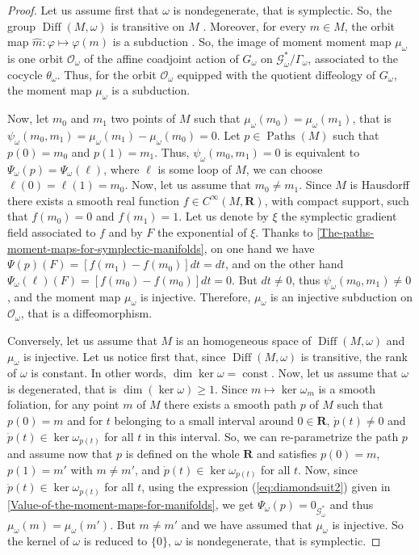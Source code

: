 \documentclass[10pt,reqno,twoside]{amsart}
\newcommand{\RR}{\mathbf{R}}
\newcommand{\cG}{\mathcal{G}}
\newcommand{\cO}{\mathcal{O}}
\DeclareMathOperator{\Diff}{Diff}
\DeclareMathOperator{\Paths}{Paths}
\DeclareMathOperator{\const}{const}
\newcommand{\Cinfty}{C^\infty}
\theoremstyle{plain}
\theoremstyle{definition}
\begin{document}
  \begin{proof}
    Let us assume first that $\omega$ is nondegenerate,
    that is symplectic.
    So,
    the group $\Diff(M,\omega)$ is transitive on $M$ \cite{Boo69}.
    Moreover,
    for every $m \in M$,
    the orbit map $\hat m : \varphi \mapsto \varphi(m)$ is a subduction \cite{Don84}.
    So,
    the image of moment moment map $\mu_\omega$ is one orbit $\cO_\omega$ of the affine coadjoint action of $G_\omega$ on $\cG^*_\omega/\Gamma_\omega$,
    associated to the cocycle $\theta_\omega$.
    Thus,
    for the orbit $\cO_\omega$ equipped with the quotient diffeology of $G_\omega$,
    the moment map $\mu_\omega$ is a subduction.
    
    Now,
    let $m_0$ and $m_1$ two points of $M$ such that $\mu_\omega(m_0) = \mu_\omega(m_1)$,
    that is $\psi_\omega(m_0,m_1) = \mu_\omega(m_1) - \mu_\omega(m_0) = 0$.
    Let $p \in \Paths(M)$ such that $p(0)= m_0$ and $p(1) = m_1$.
    Thus,
    $\psi_\omega(m_0,m_1) = 0$ is equivalent to $\Psi_\omega(p) = \Psi_\omega(\ell)$,
    where $\ell$ is some loop of $M$,
    we can choose $\ell(0)=\ell(1)=m_0$.
    Now,
    let us assume that $m_0 \neq m_1$.
    Since $M$ is Hausdorff there exists a smooth real function $f \in \Cinfty(M, \RR)$,
    with compact support,
    such that $f(m_0) = 0$ and $f(m_1) = 1$.
    Let us denote by $\xi$ the symplectic gradient field associated to $f$ and by $F$ the exponential of $\xi$.
    Thanks to \ref{The-paths-moment-maps-for-symplectic-manifolds},
    on one hand we have $\Psi(p)(F) = [f(m_1) - f(m_0)] dt = dt$,
    and on the other hand $\Psi_\omega(\ell)(F) = [f(m_0) - f(m_0)] dt = 0$.
    But $dt \neq 0$,
    thus $\psi_\omega(m_0,m_1) \neq 0$,
    and the moment map $\mu_\omega$ is injective.
    Therefore,
    $\mu_\omega$ is an injective subduction on $\cO_\omega$,
    that is a diffeomorphism.
    
    Conversely,
    let us assume that $M$ is an homogeneous space of $\Diff(M,\omega)$ and $\mu_\omega$ is injective.
    Let us notice first that,
    since $\Diff(M,\omega)$ is transitive,
    the rank of $\omega$ is constant.
    In other words,
    $\dim \ker \omega = \const$.
    Now,
    let us assume that $\omega$ is degenerated,
    that is $\dim(\ker \omega) \geq 1$.
    Since $m \mapsto \ker \omega_m$ is a smooth foliation,
    for any point $m$ of $M$ there exists a smooth path $p$ of $M$ such that $p(0) = m$ and for $t$ belonging to a small interval around $0 \in \RR$,
    $\dot p (t) \neq 0$ and $\dot p(t) \in \ker \omega_{p(t)}$ for all $t$ in this interval.
    So,
    we can re-parametrize the path $p$ and assume now that $p$ is defined on the whole $\RR$ and satisfies $p(0) = m$,
    $p(1) = m'$ with $m \neq m'$,
    and $\dot p(t) \in \ker \omega_{p(t)}$ for all $t$.
    Now,
    since $\dot p(t) \in \ker \omega_{p(t)}$ for all $t$,
    using the expression (\ref{eq:diamondsuit2}) given in \ref{Value-of-the-moment-maps-for-manifolds},
    we get $\Psi_\omega(p) = 0_{\cG^*_\omega}$ and thus $\mu_\omega(m) = \mu_\omega(m')$.
    But $m \neq m'$ and we have assumed that $\mu_\omega$ is injective.
    So the kernel of $\omega$ is reduced to $\{0\}$,
    $\omega$ is nondegenerate,
    that is symplectic.
    

\end{proof}
\end{document}
